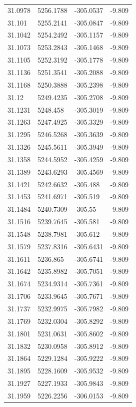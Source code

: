 \begin{table}[H]
\begin{tabular}{llll}
31.0978 & 5256.1788 & -305.0537 & -9.809 \\
31.101 & 5255.2141 & -305.0847 & -9.809 \\
31.1042 & 5254.2492 & -305.1157 & -9.809 \\
31.1073 & 5253.2843 & -305.1468 & -9.809 \\
31.1105 & 5252.3192 & -305.1778 & -9.809 \\
31.1136 & 5251.3541 & -305.2088 & -9.809 \\
31.1168 & 5250.3888 & -305.2398 & -9.809 \\
31.12 & 5249.4235 & -305.2708 & -9.809 \\
31.1231 & 5248.458 & -305.3019 & -9.809 \\
31.1263 & 5247.4925 & -305.3329 & -9.809 \\
31.1295 & 5246.5268 & -305.3639 & -9.809 \\
31.1326 & 5245.5611 & -305.3949 & -9.809 \\
31.1358 & 5244.5952 & -305.4259 & -9.809 \\
31.1389 & 5243.6293 & -305.4569 & -9.809 \\
31.1421 & 5242.6632 & -305.488 & -9.809 \\
31.1453 & 5241.6971 & -305.519 & -9.809 \\
31.1484 & 5240.7309 & -305.55 & -9.809 \\
31.1516 & 5239.7645 & -305.581 & -9.809 \\
31.1548 & 5238.7981 & -305.612 & -9.809 \\
31.1579 & 5237.8316 & -305.6431 & -9.809 \\
31.1611 & 5236.865 & -305.6741 & -9.809 \\
31.1642 & 5235.8982 & -305.7051 & -9.809 \\
31.1674 & 5234.9314 & -305.7361 & -9.809 \\
31.1706 & 5233.9645 & -305.7671 & -9.809 \\
31.1737 & 5232.9975 & -305.7982 & -9.809 \\
31.1769 & 5232.0304 & -305.8292 & -9.809 \\
31.1801 & 5231.0631 & -305.8602 & -9.809 \\
31.1832 & 5230.0958 & -305.8912 & -9.809 \\
31.1864 & 5229.1284 & -305.9222 & -9.809 \\
31.1895 & 5228.1609 & -305.9532 & -9.809 \\
31.1927 & 5227.1933 & -305.9843 & -9.809 \\
31.1959 & 5226.2256 & -306.0153 & -9.809 \\

\end{tabular}
\end{table}

